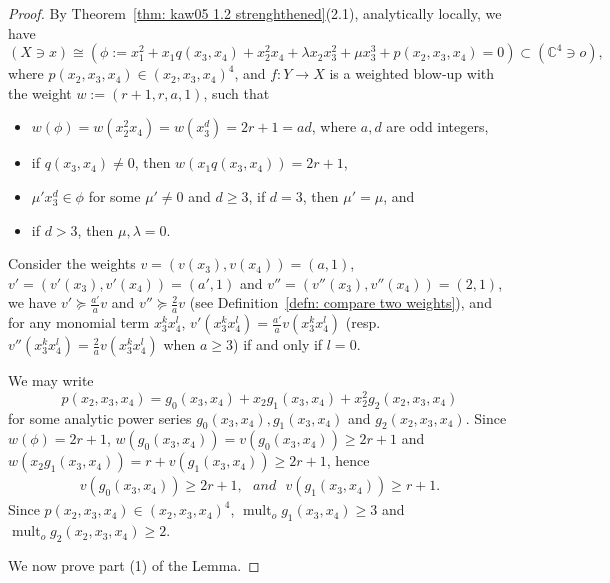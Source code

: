 \documentclass[11pt]{amsart}
\numberwithin{equation}{section}
\newcommand{\mult}{\operatorname{mult}}
\theoremstyle{definition}
\theoremstyle{definition}
\begin{document}
\begin{proof}
By Theorem~\ref{thm: kaw05 1.2 strenghthened}(2.1), analytically locally, we have $$(X\ni x)\cong (\phi:= x_1^2+x_1q(x_3,x_4)+x_2^2x_4+\lambda x_2x_3^2+\mu x_3^3+p(x_2,x_3,x_4)=0)\subset (\mathbb C^4\ni o),$$ where $p(x_2,x_3,x_4)\in(x_2,x_3,x_4)^4$, and $f: Y\to X$ is a weighted blow-up with the weight $w:=(r+1,r,a,1)$, such that 
\begin{itemize}
    \item $w(\phi)=w(x_2^2x_4)=w(x_3^d)=2r+1=ad$, where $a,d$ are odd integers,
    \item if $q(x_3,x_4)\not=0$, then $w(x_1q(x_3,x_4))=2r+1$,
    \item $\mu' x_3^d\in \phi$ for some $\mu'\neq 0$ and $d\geq 3$, if $d=3$, then $\mu'=\mu$, and
    \item if $d>3$, then $\mu,\lambda=0$.
\end{itemize}


Consider the weights $v=(v(x_3),v(x_4))=(a,1)$, $v'=(v'(x_3),v'(x_4))=(a',1)$ and $v''=(v''(x_3),v''(x_4))=(2,1)$, we have $v'\succeq \frac{a'}{a}v$ and $v''\succeq \frac{2}{a}v$ (see Definition~\ref{defn: compare two weights}), and for any monomial term $x_3^{k}x_4^l$, $v'(x_3^{k}x_4^l)=\frac{a'}{a}v(x_3^{k}x_4^l)$ (resp. $v''(x_3^{k}x_4^l)=\frac{2}{a}v(x_3^{k}x_4^l)$ when $a\geq 3$) if and only if $l=0$. 

We may write $$p(x_2,x_3,x_4)=g_0(x_3,x_4)+x_2g_1(x_3,x_4)+x_2^2g_2(x_2,x_3,x_4)$$ for some analytic power series $g_0(x_3,x_4),g_1(x_3,x_4)$ and $g_2(x_2,x_3,x_4)$. Since $w(\phi)=2r+1$, $w(g_0(x_3,x_4))=v(g_0(x_3,x_4))\geq 2r+1$ and $w(x_2g_1(x_3,x_4))=r+v(g_1(x_3,x_4))\geq 2r+1$, hence
\begin{align}\label{align: equation for cD case 1}
    v(g_0(x_3,x_4))\geq 2r+1,\ \ \ and \ \ \ v(g_1(x_3,x_4))\geq r+1.
\end{align}
Since $p(x_2,x_3,x_4)\in (x_2,x_3,x_4)^4$, $\mult_o g_1(x_3,x_4)\geq 3$ and $\mult_o g_2(x_2,x_3,x_4)\geq 2$.

\medskip

We now prove part (1) of the Lemma.


\end{proof}
\end{document}
